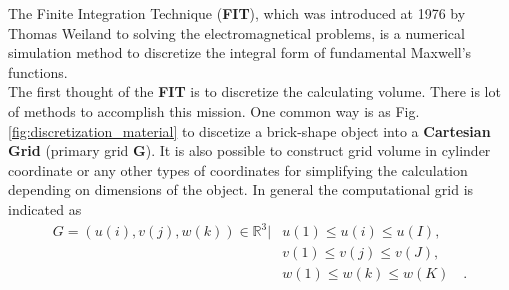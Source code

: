 The Finite Integration Technique (\textbf{FIT}), which was introduced at 1976 by Thomas Weiland\cite{FIT_discrete_method} to solving the electromagnetical problems, is a numerical simulation method to discretize the integral form of fundamental Maxwell's functions.\\

The first thought of the \textbf{FIT} is to discretize the calculating volume. There is lot of methods to accomplish this mission. One common way is as Fig. \ref{fig:discretization_material} to discetize a brick-shape object into a \textbf{Cartesian Grid} (primary grid \textbf{G}). It is also possible to construct grid volume in cylinder coordinate or any other types of  coordinates\cite{FIT_triangular_discretization,FDTD_nonorthogonal_grids} for simplifying the calculation depending on dimensions of the object. In general  the computational grid is indicated as \\
\begin{align}
G=
(u(i),v(j),w(k))\in \mathbb{R}^3|&u(1)\leq u(i)\leq u(I),\nonumber\\
													 &v(1)\leq v(j)\leq v(J),\nonumber\\ 
													 &w(1)\leq w(k)\leq w(K)\quad \text{.}
\label{eq:grid}
\end{align}

